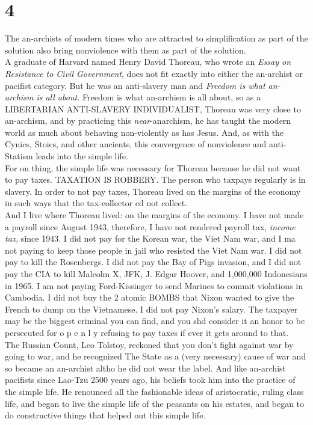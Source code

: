 \section*{4}
The an-archists of modern times who are attracted to simplification as part of the solution also bring nonviolence with them as part of the solution.\\
A graduate of Harvard named Henry David Thoreau, who wrote an \emph{Essay on Resistance to Civil Government}, does not fit exactly into either the an-archist or pacifist category. But he was an anti-slavery man and \emph{Freedom is what an-archism is all about.} Freedom is what an-archism is all about, so as a LIBERTARIAN ANTI-SLAVERY INDIVIDUALIST, Thoreau was very close to an-archism, and by practicing this \emph{near}-anarchism, he has taught the modern world as much about behaving non-violently as has Jesus. And, as with the Cynics, Stoics, and other ancients, this convergence of nonviolence and anti-Statism leads into the simple life.\\
For on thing, the simple life was necessary for Thoreau because he did not want to pay taxes. TAXATION IS ROBBERY. The person who taxpays regularly is in slavery. In order to not pay taxes, Thoreau lived on the margins of the economy in such ways that the tax-collector cd not collect.\\
And I live where Thoreau lived: on the margins of the economy. I have not made a payroll since August 1943, therefore, I have not rendered payroll tax, \emph{income tax}, since 1943. I did not pay for the Korean war, the Viet Nam war, and I ma not paying to keep those people in jail who resisted the Viet Nam war. I did not pay to kill the Rosenbergs. I did not pay the Bay of Pigs invasion, and I did not pay the CIA to kill Malcolm X, JFK, J. Edgar Hoover, and 1,000,000 Indonesians in 1965. I am not paying Ford-Kissinger to send Marines to commit violations in Cambodia. I did not buy the 2 atomic BOMBS that Nixon wanted to give the French to dump on the Vietnamese. I did not pay Nixon's salary. The taxpayer may be the biggest criminal you can find, and you shd consider it an honor to be persecuted for o p e n l y refusing to pay taxes if ever it gets around to that.\\
The Russian Count, Leo Tolstoy, reckoned that you don't fight against war by going to war, and he recognized The State as a (very necessary) cause of war and so became an an-archist altho he did not wear the label. And like an-archist pacifists since Lao-Tzu 2500 years ago, his beliefs took him into the practice of the simple life. He renounced all the fashionable ideas of aristocratic, ruling class life, and began to live the simple life of the peasants on his estates, and began to do constructive things that helped out this simple life.\\
